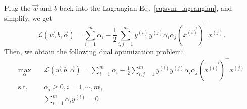 \documentclass[10pt,onecolumn]{book}
\begin{document}
Plug the $\vec{w}$ and $b$ back into the Lagrangian Eq.~\ref{eq:svm_lagrangian}, and simplify, we get
\begin{equation}
\mathcal{L}(\vec{w}, b, \vec{\alpha}) = \sum_{i = 1}^m \alpha_i - \frac{1}{2} \sum_{i,j=1}^m y^{(i)} y^{(j)} \alpha_i \alpha_j(\overrightarrow{x^{(i)}})^\top x^{(j)}.
\end{equation}
Then, we obtain the following \uline{dual optimization problem}:
\begin{equation}
\begin{split}
\max_\alpha & \quad \mathcal{L}(\vec{w}, b, \vec{\alpha}) = \sum_{i = 1}^m \alpha_i - \frac{1}{2} \sum_{i,j=1}^m y^{(i)} y^{(j)} \alpha_i \alpha_j(\overrightarrow{x^{(i)}})^\top x^{(j)} \\
\text{s.t.} & \quad \alpha_i \geq 0, i=1,\cdots, m, \\
& \quad \sum_{i=1}^m \alpha_i y^{(i)} = 0
\end{split}
\end{equation}

\end{document}
